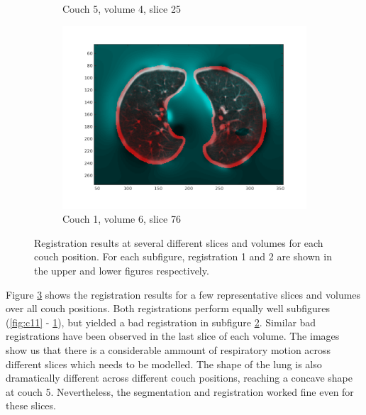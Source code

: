 \documentclass[11pt,a4paper,oneside]{report}
\begin{document}
\begin{figure}[H]
\begin{subfigure}[b]{0.3\textwidth}
                \caption{Couch 5, volume 4, slice 25}
                \label{fig:c22}
        \end{subfigure}
        \begin{subfigure}[b]{0.3\textwidth}
                \includegraphics[width=\textwidth, trim=20 20 20 20]{figures/reg2/reg1_6_76.png}
                \caption{Couch 1, volume 6, slice 76}
                \label{fig:c23}
        \end{subfigure}
        \caption{Registration results at several different slices and volumes for each couch position. For each subfigure, registration 1 and 2 are shown in the upper and lower figures respectively.}
        \label{fig:c1vis}
\end{figure}


Figure \ref{fig:c1vis} shows the registration results for a few representative slices and volumes over all couch positions. Both registrations perform equally well subfigures (\ref{fig:c11} - \ref{fig:c22}), but yielded a bad registration in subfigure \ref{fig:c23}. Similar bad registrations have been observed in the last slice of each volume. The images show us that there is a considerable ammount of respiratory motion across different slices which needs to be modelled. The shape of the lung is also dramatically different across different couch positions, reaching a concave shape at couch 5. Nevertheless, the segmentation and registration worked fine even for these slices.
\end{document}
